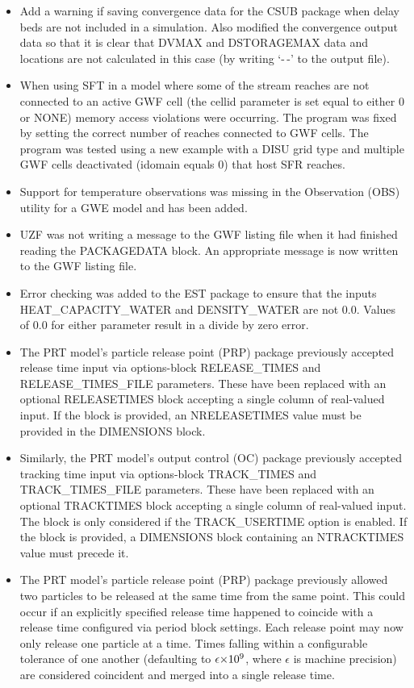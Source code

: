 \begin{itemize}
		\item Add a warning if saving convergence data for the CSUB package when delay beds are not included in a simulation. Also modified the convergence output data so that it is clear that DVMAX and DSTORAGEMAX data and locations are not calculated in this case (by writing `-\,-' to the output file). 
		\item When using SFT in a model where some of the stream reaches are not connected to an active GWF cell (the cellid parameter is set equal to either 0 or NONE) memory access violations were occurring.  The program was fixed by setting the correct number of reaches connected to GWF cells.  The program was tested using a new example with a DISU grid type and multiple GWF cells deactivated (idomain equals 0) that host SFR reaches.
		\item Support for temperature observations was missing in the Observation (OBS) utility for a GWE model and has been added.
		\item UZF was not writing a message to the GWF listing file when it had finished reading the PACKAGEDATA block.  An appropriate message is now written to the GWF listing file.
		\item Error checking was added to the EST package to ensure that the inputs HEAT\_CAPACITY\_WATER and DENSITY\_WATER are not 0.0.  Values of 0.0 for either parameter result in a divide by zero error.
		\item The PRT model's particle release point (PRP) package previously accepted release time input via options-block RELEASE\_TIMES and RELEASE\_TIMES\_FILE parameters. These have been replaced with an optional RELEASETIMES block accepting a single column of real-valued input. If the block is provided, an NRELEASETIMES value must be provided in the DIMENSIONS block.
		\item Similarly, the PRT model's output control (OC) package previously accepted tracking time input via options-block TRACK\_TIMES and TRACK\_TIMES\_FILE parameters. These have been replaced with an optional TRACKTIMES block accepting a single column of real-valued input. The block is only considered if the TRACK\_USERTIME option is enabled. If the block is provided, a DIMENSIONS block containing an NTRACKTIMES value must precede it.
		\item The PRT model's particle release point (PRP) package previously allowed two particles to be released at the same time from the same point. This could occur if an explicitly specified release time happened to coincide with a release time configured via period block settings. Each release point may now only release one particle at a time. Times falling within a configurable tolerance of one another (defaulting to $\sisetup{input-digits = 0123456789\epsilon} \num{\epsilon e+9}$, where $\epsilon$ is machine precision) are considered coincident and merged into a single release time.

\end{itemize}
